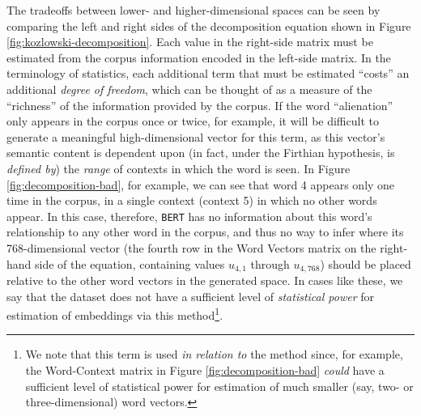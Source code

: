 \documentclass[11pt]{article}
\newcommand{\BERT}[0]{\texttt{BERT}}
\begin{document}
The tradeoffs between lower- and higher-dimensional spaces can be seen by comparing the left and right sides of the decomposition equation shown in Figure \ref{fig:kozlowski-decomposition}. Each value in the right-side matrix must be estimated from the corpus information encoded in the left-side matrix. In the terminology of statistics, each additional term that must be estimated ``costs'' an additional \textit{degree of freedom}, which can be thought of as a measure of the ``richness'' of the information provided by the corpus. If the word ``alienation'' only appears in the corpus once or twice, for example, it will be difficult to generate a meaningful high-dimensional vector for this term, as this vector's semantic content is dependent upon (in fact, under the Firthian hypothesis, is \textit{defined by}) the \textit{range} of contexts in which the word is seen. In Figure \ref{fig:decomposition-bad}, for example, we can see that word 4 appears only one time in the corpus, in a single context (context 5) in which no other words appear. In this case, therefore, \BERT{} has no information about this word's relationship to any other word in the corpus, and thus no way to infer where its 768-dimensional vector (the fourth row in the Word Vectors matrix on the right-hand side of the equation, containing values $u_{4,1}$ through $u_{4,768}$) should be placed relative to the other word vectors in the generated space. In cases like these, we say that the dataset does not have a sufficient level of \textit{statistical power} for estimation of embeddings via this method\footnote{We note that this term is used \textit{in relation to} the method since, for example, the Word-Context matrix in Figure \ref{fig:decomposition-bad} \textit{could} have a sufficient level of statistical power for estimation of much smaller (say, two- or three-dimensional) word vectors.}.


\end{document}

